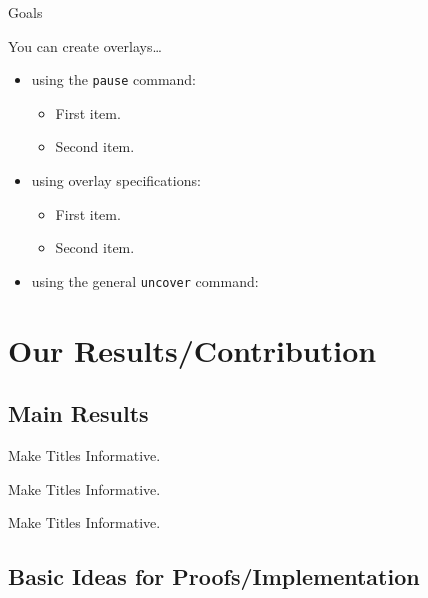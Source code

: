 \documentclass{beamer}
\begin{document}
\begin{frame}{Goals}

  You can create overlays\dots
  \begin{itemize}
  \item using the \texttt{pause} command:
    \begin{itemize}
    \item
      First item.
      \pause
    \item    
      Second item.
    \end{itemize}
  \item
    using overlay specifications:
    \begin{itemize}
    \item<3->
      First item.
    \item<4->
      Second item.
    \end{itemize}
  \item
    using the general \texttt{uncover} command:
    \begin{itemize}
    \end{itemize}
  \end{itemize}
\end{frame}


\section{Our Results/Contribution}

\subsection{Main Results}

\begin{frame}{Make Titles Informative.}
\end{frame}

\begin{frame}{Make Titles Informative.}
\end{frame}

\begin{frame}{Make Titles Informative.}
\end{frame}


\subsection{Basic Ideas for Proofs/Implementation}
\end{document}
